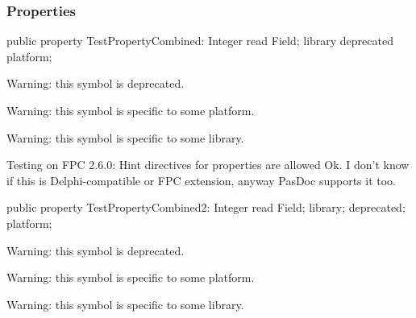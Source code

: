\documentclass{report}
\newif\ifpdf
\begin{document}
\subsubsection*{\large{\textbf{Properties}}\normalsize\hspace{1ex}\hfill}
\begin{list}{}{
\setlength{\itemindent}{0cm}
\setlength{\listparindent}{0cm}
\setlength{\leftmargin}{\evensidemargin}
\addtolength{\leftmargin}{\tmplength}
\settowidth{\labelsep}{X}
\addtolength{\leftmargin}{\labelsep}
\setlength{\labelwidth}{\tmplength}
}
\label{ok_hint_directives.TTestClassDeprecated-TestPropertyCombined}
\item[\textbf{TestPropertyCombined}\hfill]
\ifpdf
\begin{flushleft}
\fi
\begin{ttfamily}
public property TestPropertyCombined: Integer read Field; library deprecated platform;\end{ttfamily}

\ifpdf
\end{flushleft}
\fi


\par Warning: this symbol is deprecated.

Warning: this symbol is specific to some platform.

Warning: this symbol is specific to some library.

Testing on FPC 2.6.0: Hint directives for properties are allowed Ok. I don't know if this is Delphi{-}compatible or FPC extension, anyway PasDoc supports it too.\label{ok_hint_directives.TTestClassDeprecated-TestPropertyCombined2}
\item[\textbf{TestPropertyCombined2}\hfill]
\ifpdf
\begin{flushleft}
\fi
\begin{ttfamily}
public property TestPropertyCombined2: Integer read Field; library; deprecated; platform;\end{ttfamily}

\ifpdf
\end{flushleft}
\fi


\par Warning: this symbol is deprecated.

Warning: this symbol is specific to some platform.

Warning: this symbol is specific to some library.

 \end{list}
\end{document}
